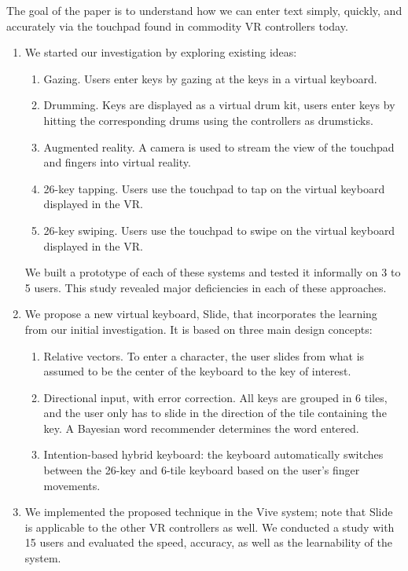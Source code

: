 The goal of the paper is to understand how we can enter text simply, quickly, and accurately via the touchpad found in commodity VR controllers today.  
\begin{enumerate}
\item
We started our investigation by exploring existing ideas:
\begin{enumerate}
\item
Gazing.  Users enter keys by gazing at the keys in a virtual keyboard. 

\item
Drumming.  Keys are displayed as a virtual drum kit, users enter keys by hitting the corresponding drums using the controllers as drumsticks\cite{Google:VRdrum}. 

\item
Augmented reality.  A camera is used to stream the view of the touchpad and fingers into
virtual reality.  

\item
26-key tapping.  Users use the touchpad to tap on the virtual keyboard displayed in the VR. 

\item
26-key swiping.  Users use the touchpad to swipe on the virtual keyboard displayed in the VR. 
\end{enumerate}
We built a prototype of each of these systems and tested it informally on 3 to 5 users.  This study revealed major deficiencies in each of these approaches.  

\item
We propose a new virtual keyboard, Slide, that incorporates the learning from our initial investigation.  It is based on three main design concepts: 
\begin{enumerate}
\item
Relative vectors.  To enter a character, the user slides from what is assumed to be the center of the keyboard to the key of interest.  

\item
Directional input, with error correction.  All keys are grouped in 6 tiles, and the user only has to slide in the direction of the tile containing the key.  A Bayesian word recommender determines the word entered. 

\item
Intention-based hybrid keyboard: the keyboard automatically switches between the 26-key and 6-tile keyboard based on the user's finger movements.  
\end{enumerate}

\item 
We implemented the proposed technique in the Vive system; note that Slide is applicable to the other VR controllers as well.   We conducted a study with 15 users and evaluated the speed, accuracy, as well as the learnability of the system. 
\end{enumerate}

